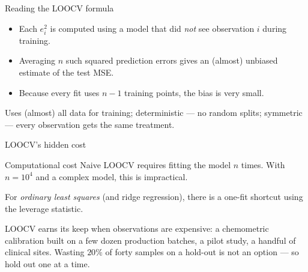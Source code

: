 \documentclass[aspectratio=169,11pt]{beamer}
\begin{document}
\begin{frame}{Reading the LOOCV formula}
  \begin{readme}
    \begin{itemize}
      \item Each $e_i^2$ is computed using a model that did
            \emph{not} see observation $i$ during training.
      \item Averaging $n$ such squared prediction errors gives an
            (almost) unbiased estimate of the test MSE.
      \item Because every fit uses $n - 1$ training points, the bias
            is very small.
    \end{itemize}
  \end{readme}
  \begin{takeaway}[Pros]
    Uses (almost) all data for training; deterministic --- no random
    splits; symmetric --- every observation gets the same treatment.
  \end{takeaway}
\end{frame}

\begin{frame}{LOOCV's hidden cost}
  \begin{alertblock}{Computational cost}
    Naive LOOCV requires fitting the model $n$ times. With $n = 10^4$
    and a complex model, this is impractical.
  \end{alertblock}
  \begin{takeaway}
    For \emph{ordinary least squares} (and ridge regression), there
    is a one-fit shortcut using the leverage statistic.
  \end{takeaway}
  \begin{industry}
    LOOCV earns its keep when observations are expensive: a chemometric
    calibration built on a few dozen production batches, a pilot study, a
    handful of clinical sites. Wasting $20\%$ of forty samples on a
    hold-out is not an option --- so hold out one at a time.
  \end{industry}
\end{frame}
\end{document}
